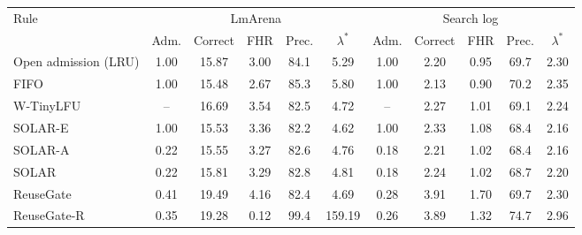 \begin{tabular}{lcccccccccc}
\toprule
Rule & \multicolumn{5}{c}{LmArena} & \multicolumn{5}{c}{Search log}\\
 & Adm. & Correct & FHR & Prec. & $\lambda^{*}$ & Adm. & Correct & FHR & Prec. & $\lambda^{*}$\\
\midrule
Open admission (LRU) & 1.00 & 15.87 & 3.00 & 84.1 & 5.29 & 1.00 & 2.20 & 0.95 & 69.7 & 2.30\\
FIFO & 1.00 & 15.48 & 2.67 & 85.3 & 5.80 & 1.00 & 2.13 & 0.90 & 70.2 & 2.35\\
W-TinyLFU & -- & 16.69 & 3.54 & 82.5 & 4.72 & -- & 2.27 & 1.01 & 69.1 & 2.24\\
\midrule
SOLAR-E & 1.00 & 15.53 & 3.36 & 82.2 & 4.62 & 1.00 & 2.33 & 1.08 & 68.4 & 2.16\\
SOLAR-A & 0.22 & 15.55 & 3.27 & 82.6 & 4.76 & 0.18 & 2.21 & 1.02 & 68.4 & 2.16\\
SOLAR & 0.22 & 15.81 & 3.29 & 82.8 & 4.81 & 0.18 & 2.24 & 1.02 & 68.7 & 2.20\\
\midrule
ReuseGate & 0.41 & 19.49 & 4.16 & 82.4 & 4.69 & 0.28 & 3.91 & 1.70 & 69.7 & 2.30\\
ReuseGate-R & 0.35 & 19.28 & 0.12 & 99.4 & 159.19 & 0.26 & 3.89 & 1.32 & 74.7 & 2.96\\
\bottomrule
\end{tabular}
